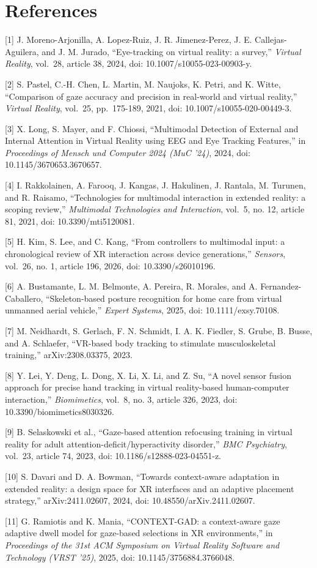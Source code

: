 \documentclass[
  10pt,
]{article}
\begin{document}
\section{References}\label{references}

{[}1{]} J. Moreno-Arjonilla, A. Lopez-Ruiz, J. R. Jimenez-Perez, J. E.
Callejas-Aguilera, and J. M. Jurado, ``Eye-tracking on virtual reality:
a survey,'' \emph{Virtual Reality}, vol.~28, article 38, 2024, doi:
10.1007/s10055-023-00903-y.

{[}2{]} S. Pastel, C.-H. Chen, L. Martin, M. Naujoks, K. Petri, and K.
Witte, ``Comparison of gaze accuracy and precision in real-world and
virtual reality,'' \emph{Virtual Reality}, vol.~25, pp.~175-189, 2021,
doi: 10.1007/s10055-020-00449-3.

{[}3{]} X. Long, S. Mayer, and F. Chiossi, ``Multimodal Detection of
External and Internal Attention in Virtual Reality using EEG and Eye
Tracking Features,'' in \emph{Proceedings of Mensch und Computer 2024
(MuC '24)}, 2024, doi: 10.1145/3670653.3670657.

{[}4{]} I. Rakkolainen, A. Farooq, J. Kangas, J. Hakulinen, J. Rantala,
M. Turunen, and R. Raisamo, ``Technologies for multimodal interaction in
extended reality: a scoping review,'' \emph{Multimodal Technologies and
Interaction}, vol.~5, no. 12, article 81, 2021, doi: 10.3390/mti5120081.

{[}5{]} H. Kim, S. Lee, and C. Kang, ``From controllers to multimodal
input: a chronological review of XR interaction across device
generations,'' \emph{Sensors}, vol.~26, no. 1, article 196, 2026, doi:
10.3390/s26010196.

{[}6{]} A. Bustamante, L. M. Belmonte, A. Pereira, R. Morales, and A.
Fernandez-Caballero, ``Skeleton-based posture recognition for home care
from virtual unmanned aerial vehicle,'' \emph{Expert Systems}, 2025,
doi: 10.1111/exsy.70108.

{[}7{]} M. Neidhardt, S. Gerlach, F. N. Schmidt, I. A. K. Fiedler, S.
Grube, B. Busse, and A. Schlaefer, ``VR-based body tracking to stimulate
musculoskeletal training,'' arXiv:2308.03375, 2023.

{[}8{]} Y. Lei, Y. Deng, L. Dong, X. Li, X. Li, and Z. Su, ``A novel
sensor fusion approach for precise hand tracking in virtual
reality-based human-computer interaction,'' \emph{Biomimetics}, vol.~8,
no. 3, article 326, 2023, doi: 10.3390/biomimetics8030326.

{[}9{]} B. Selaskowski et al., ``Gaze-based attention refocusing
training in virtual reality for adult attention-deficit/hyperactivity
disorder,'' \emph{BMC Psychiatry}, vol.~23, article 74, 2023, doi:
10.1186/s12888-023-04551-z.

{[}10{]} S. Davari and D. A. Bowman, ``Towards context-aware adaptation
in extended reality: a design space for XR interfaces and an adaptive
placement strategy,'' arXiv:2411.02607, 2024, doi:
10.48550/arXiv.2411.02607.

{[}11{]} G. Ramiotis and K. Mania, ``CONTEXT-GAD: a context-aware gaze
adaptive dwell model for gaze-based selections in XR environments,'' in
\emph{Proceedings of the 31st ACM Symposium on Virtual Reality Software
and Technology (VRST '25)}, 2025, doi: 10.1145/3756884.3766048.
\end{document}
